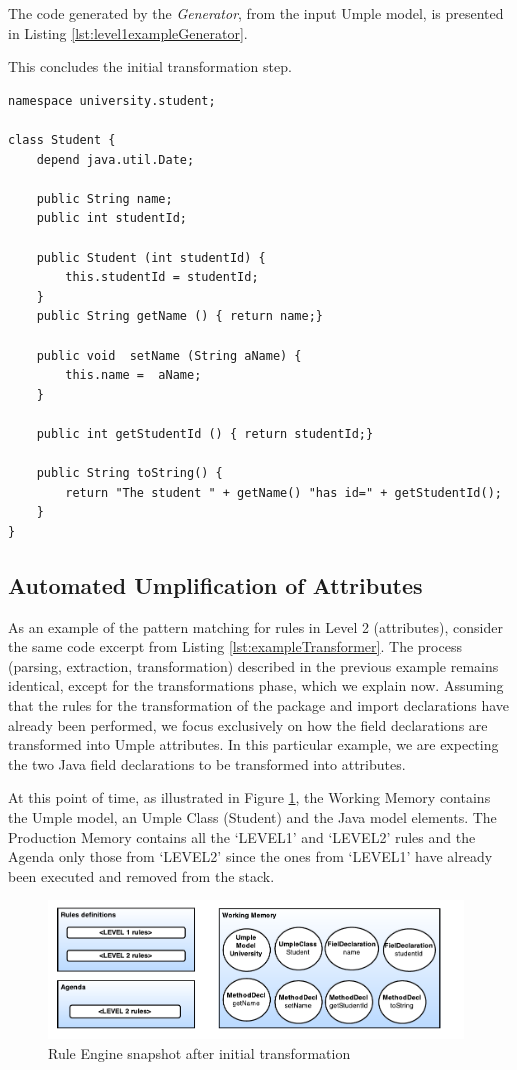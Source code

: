 The code generated by the \textit{Generator}, from the input Umple model, is presented in Listing \ref{lst:level1exampleGenerator}. 

This concludes the initial transformation step.

\begin{lstlisting}[style=umpleOut, label=lst:level1exampleGenerator, caption=Umple code generated -- Level 1]
namespace university.student;

class Student {
	depend java.util.Date;
	
    public String name;
    public int studentId;
    
    public Student (int studentId) {
    	this.studentId = studentId;
    }
    public String getName () { return name;}
    
    public void  setName (String aName) { 
    	this.name =  aName;
    }
   
    public int getStudentId () { return studentId;}

    public String toString() {
    	return "The student " + getName() "has id=" + getStudentId();
    }
}   
\end{lstlisting}

\subsection{Automated Umplification of Attributes}

As an example of the pattern matching for rules in Level 2 (attributes), consider the same code excerpt from Listing \ref{lst:exampleTransformer}. The process (parsing, extraction, transformation) described in the previous example remains identical, except for the transformations phase, which we explain now. Assuming that the rules for the transformation of the package and import declarations have already been performed, we focus exclusively on how the field declarations are transformed into Umple attributes. In this particular example, we are expecting the two Java field declarations to be transformed into attributes. 

At this point of time, as illustrated in Figure \ref{fig:ruleModel2}, the Working Memory contains the Umple model, an Umple Class (Student) and the Java model elements. The Production Memory contains all the `LEVEL1' and `LEVEL2' rules and the Agenda only those from `LEVEL2' since the ones from `LEVEL1' have already been executed and removed from the stack.

\begin{figure}[h]
\centering
\includegraphics[width=0.98\textwidth]{Figures/ruleModel2.pdf}
\caption{Rule Engine snapshot after initial transformation}
\label{fig:ruleModel2}
\end{figure}

